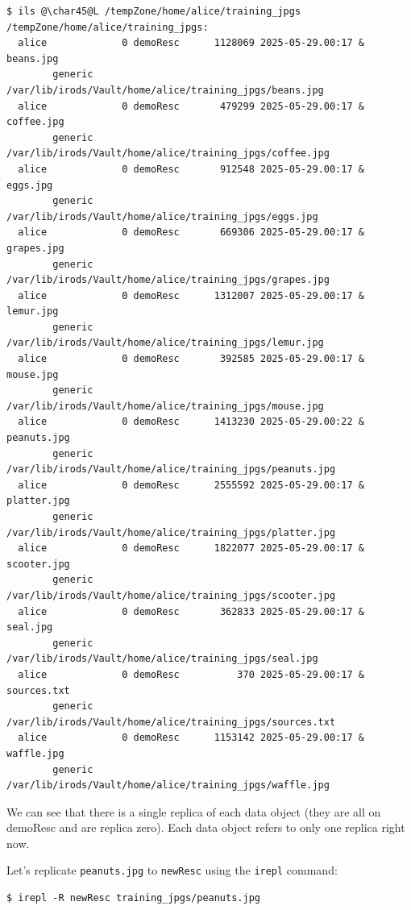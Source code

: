 \documentclass[10pt,oneside]{memoir}
\begin{document}
\begin{lstlisting}[basicstyle=\tiny\ttfamily]
$ ils @\char45@L /tempZone/home/alice/training_jpgs
/tempZone/home/alice/training_jpgs:
  alice             0 demoResc      1128069 2025-05-29.00:17 & beans.jpg
        generic    /var/lib/irods/Vault/home/alice/training_jpgs/beans.jpg
  alice             0 demoResc       479299 2025-05-29.00:17 & coffee.jpg
        generic    /var/lib/irods/Vault/home/alice/training_jpgs/coffee.jpg
  alice             0 demoResc       912548 2025-05-29.00:17 & eggs.jpg
        generic    /var/lib/irods/Vault/home/alice/training_jpgs/eggs.jpg
  alice             0 demoResc       669306 2025-05-29.00:17 & grapes.jpg
        generic    /var/lib/irods/Vault/home/alice/training_jpgs/grapes.jpg
  alice             0 demoResc      1312007 2025-05-29.00:17 & lemur.jpg
        generic    /var/lib/irods/Vault/home/alice/training_jpgs/lemur.jpg
  alice             0 demoResc       392585 2025-05-29.00:17 & mouse.jpg
        generic    /var/lib/irods/Vault/home/alice/training_jpgs/mouse.jpg
  alice             0 demoResc      1413230 2025-05-29.00:22 & peanuts.jpg
        generic    /var/lib/irods/Vault/home/alice/training_jpgs/peanuts.jpg
  alice             0 demoResc      2555592 2025-05-29.00:17 & platter.jpg
        generic    /var/lib/irods/Vault/home/alice/training_jpgs/platter.jpg
  alice             0 demoResc      1822077 2025-05-29.00:17 & scooter.jpg
        generic    /var/lib/irods/Vault/home/alice/training_jpgs/scooter.jpg
  alice             0 demoResc       362833 2025-05-29.00:17 & seal.jpg
        generic    /var/lib/irods/Vault/home/alice/training_jpgs/seal.jpg
  alice             0 demoResc          370 2025-05-29.00:17 & sources.txt
        generic    /var/lib/irods/Vault/home/alice/training_jpgs/sources.txt
  alice             0 demoResc      1153142 2025-05-29.00:17 & waffle.jpg
        generic    /var/lib/irods/Vault/home/alice/training_jpgs/waffle.jpg
\end{lstlisting}

We can see that there is a single replica of each data object (they are all on demoResc and are replica zero). Each data object refers to only one replica right now.

Let's replicate \texttt{peanuts.jpg} to \texttt{newResc} using the \texttt{irepl} command:

\begin{lstlisting}
$ irepl -R newResc training_jpgs/peanuts.jpg
\end{lstlisting}
\end{document}
